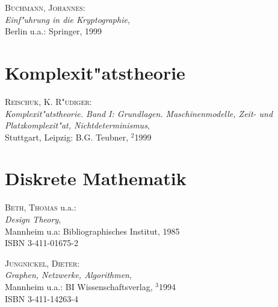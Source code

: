 \begin{description}
  

\item \textsc{Buchmann, Johannes}: \\
  \textit{Einf"uhrung in die Kryptographie}, \\
  Berlin u.a.: Springer, 1999

\end{description}


\section{Komplexit"atstheorie}

\begin{description}
  

\item \textsc{Reischuk, K. R"udiger}: \\
  \textit{Komplexit"atstheorie. Band I: Grundlagen. Maschinenmodelle,
    Zeit- und Platzkomplexit"at, Nichtdeterminismus}, \\
  Stuttgart, Leipzig: B.G. Teubner, $^2$1999

\end{description}


\section{Diskrete Mathematik}

\begin{description}
  

\item \textsc{Beth, Thomas} u.a.: \\
  \textit{Design Theory}, \\
  Mannheim u.a: Bibliographisches Institut, 1985 \\
  ISBN 3-411-01675-2
  

\item \textsc{Jungnickel, Dieter}: \\
  \textit{Graphen, Netzwerke, Algorithmen}, \\
  Mannheim u.a.: BI Wissenschaftsverlag, $^3$1994 \\
  ISBN 3-411-14263-4

\end{description}


